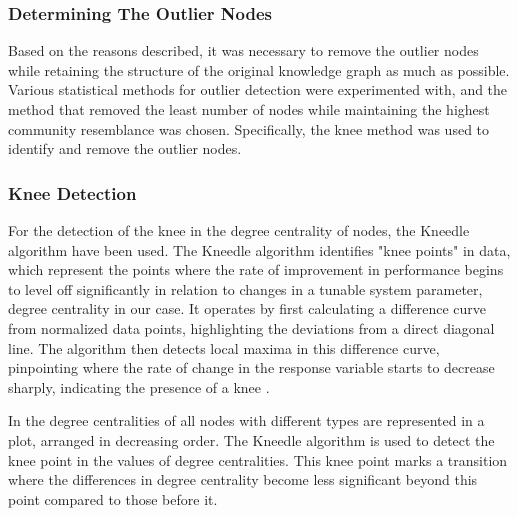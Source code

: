 \subsubsection*{Determining The Outlier Nodes}

Based on the reasons described, it was necessary to remove the outlier nodes while
retaining the structure of the original knowledge graph as much as possible.
Various statistical methods for outlier detection were experimented with, and the
method that removed the least number of nodes while maintaining the highest community
resemblance was chosen. Specifically, the knee method was used to identify and remove
the outlier nodes.

\subsubsection*{Knee Detection}
For the detection of the knee in the degree centrality of nodes, the Kneedle algorithm
have been used. The Kneedle algorithm identifies "knee points" in data, which represent
the points where the rate of improvement in performance begins to level off significantly
in relation to changes in a tunable system parameter, degree centrality in our
case. It operates by first calculating a difference curve from normalized data points,
highlighting the deviations from a direct diagonal line. The algorithm then detects
local maxima in this difference curve, pinpointing where the rate of change in
the response variable starts to decrease sharply, indicating the presence of a knee
\parencite{satopaa_finding_2011}.

In  the degree centralities of all
nodes with different types are represented in a plot, arranged in decreasing order. The Kneedle
algorithm is used to detect the knee point in the values of degree centralities.
This knee point marks a transition where the differences in degree centrality
become less significant beyond this point compared to those before it.



